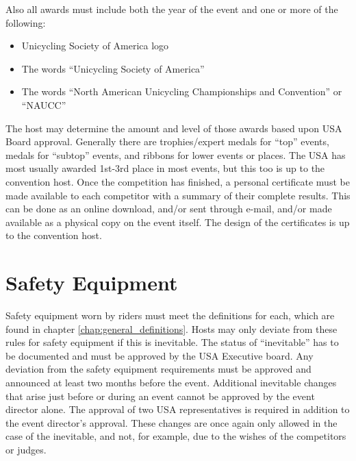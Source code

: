Also all awards must include both the year of the event and one or more of the following:
\begin{itemize}
\item Unicycling Society of America logo
\item The words ``Unicycling Society of America''
\item The words ``North American Unicycling Championships and Convention'' or ``NAUCC''
 \end{itemize}

 The host may determine the amount and level of those awards based upon USA Board approval.
 Generally there are trophies/expert medals for ``top'' events, medals for ``subtop'' events, and ribbons for lower events or places.
 The USA has most usually awarded 1st-3rd place in most events, but this too is up to the convention host.
Once the competition has finished, a personal certificate must be made available to each competitor with a summary of their complete results.
This can be done as an online download, and/or sent through e-mail, and/or made available as a physical copy on the event itself.
The design of the certificates is up to the convention host.

\section{Safety Equipment}

Safety equipment worn by riders must meet the definitions for each, which are found in chapter \ref{chap:general_definitions}.
Hosts may only deviate from these rules for safety equipment if this is inevitable.
The status of ``inevitable'' has to be documented and must be approved by the USA Executive board.
Any deviation from the safety equipment requirements must be approved and announced at least two months before the event.
Additional inevitable changes that arise just before or during an event cannot be approved by the event director alone.
The approval of two USA representatives is required in addition to the event director's approval.
These changes are once again only allowed in the case of the inevitable, and not, for example, due to the wishes of the competitors or judges.

